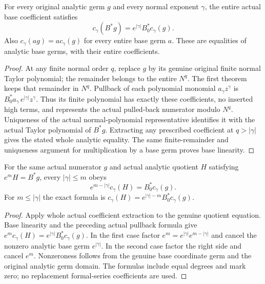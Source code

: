 \begin{theorem}
\label{hir:actual-coefficient-controlled-pullback-coefficients}
\leanok
For every original analytic germ $g$ and every normal exponent $\gamma$, the entire actual base coefficient satisfies
\[
 c_\gamma(B^*g)=e^{|\gamma|}B_0^*c_\gamma(g).
\]
Also $c_\gamma(a g)=a c_\gamma(g)$ for every entire base germ $a$. These are equalities of analytic base germs, with their entire coefficients.
\end{theorem}
\begin{proof}
At any finite normal order $q$, replace $g$ by its genuine original finite normal Taylor polynomial; the remainder belongs to the entire $N^q$. The first theorem keeps that remainder in $N^q$. Pullback of each polynomial monomial $a_\gamma z^\gamma$ is $B_0^*a_\gamma\, e^{|\gamma|}z^\gamma$. Thus its finite polynomial has exactly these coefficients, no inserted high terms, and represents the actual pulled-back numerator modulo $N^q$. Uniqueness of the actual normal-polynomial representative identifies it with the actual Taylor polynomial of $B^*g$. Extracting any prescribed coefficient at $q>|\gamma|$ gives the stated whole analytic equality. The same finite-remainder and uniqueness argument for multiplication by a base germ proves base linearity.
\end{proof}

\begin{theorem}
\label{hir:actual-coefficient-controlled-quotient-coefficients}
\leanok
For the same actual numerator $g$ and actual analytic quotient $H$ satisfying $e^mH=B^*g$, every $|\gamma|\le m$ obeys
\[
 e^{m-|\gamma|}c_\gamma(H)=B_0^*c_\gamma(g).
\]
For $m\le|\gamma|$ the exact formula is $c_\gamma(H)=e^{|\gamma|-m}B_0^*c_\gamma(g)$.
\end{theorem}
\begin{proof}
Apply whole actual coefficient extraction to the genuine quotient equation. Base linearity and the preceding actual pullback formula give $e^m c_\gamma(H)=e^{|\gamma|}B_0^*c_\gamma(g)$. In the first case factor $e^m=e^{|\gamma|}e^{m-|\gamma|}$ and cancel the nonzero analytic base germ $e^{|\gamma|}$. In the second case factor the right side and cancel $e^m$. Nonzeroness follows from the genuine base coordinate germ and the original analytic germ domain. The formulas include equal degrees and mark zero; no replacement formal-series coefficients are used.
\end{proof}

